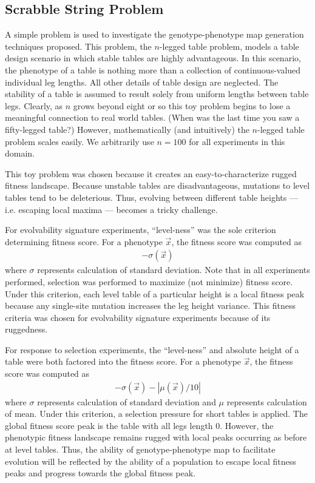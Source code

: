 \subsection{Scrabble String Problem}

A simple problem is used to investigate the genotype-phenotype map generation techniques proposed.
This problem, the $n$-legged table problem, models a table design scenario
in which stable tables are highly advantageous.
In this scenario, the phenotype of a table is nothing more than a collection of continuous-valued individual leg lengths.
All other details of table design are neglected.
The stability of a table is assumed to result solely from uniform lengths between table legs.
Clearly, as $n$ grows beyond eight or so this toy problem begins to lose a meaningful connection to real world tables.
(When was the last time you saw a fifty-legged table?)
However, mathematically (and intuitively) the $n$-legged table problem scales easily.
We arbitrarily use $n=100$ for all experiments in this domain.

This toy problem was chosen because it creates an easy-to-characterize rugged fitness landscape.
Because unstable tables are disadvantageous, mutations to level tables tend to be deleterious.
Thus, evolving between different table heights --- i.e. escaping local maxima --- becomes a tricky challenge.

For evolvability signature experiments, ``level-ness'' was the sole criterion determining fitness score.
For a phenotype $\vec{x}$, the fitness score was computed as
\begin{align*}
-\sigma(\vec{x})
\end{align*}
where $\sigma$ represents calculation of standard deviation.
Note that in all experiments performed, selection was performed to maximize (not minimize) fitness score.
Under this criterion, each level table of a particular height is a local fitness peak because any single-site mutation increases the leg height variance.
This fitness criteria was chosen for evolvability signature experiments because of its ruggedness.

For response to selection experiments, the ``level-ness'' and absolute height of a table were both factored into the fitness score.
For a phenotype $\vec{x}$, the fitness score was computed as
\begin{align*}
-\sigma(\vec{x}) - |\mu(\vec{x})/10|
\end{align*}
where $\sigma$ represents calculation of standard deviation and $\mu$ represents calculation of mean.
Under this criterion, a selection pressure for short tables is applied.
The global fitness score peak is the table with all legs length 0.
However, the phenotypic fitness landscape remains rugged with local peaks occurring as before at level tables.
Thus, the ability of genotype-phenotype map to facilitate evolution will be reflected by the ability of a population to escape local fitness peaks and progress towards the global fitness peak.


